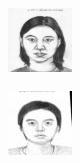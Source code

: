\documentclass{IEEEcsmag}
\begin{document}
\begin{figure}[ht]
\begin{subfigure}{0.12\textwidth}
    \end{subfigure}
    \begin{subfigure}{0.12\textwidth}
        \includegraphics[width=\linewidth]{CUHK_Student/draws_resized/f1-008-01-sz1.jpg}
    \end{subfigure}
    \begin{subfigure}{0.12\textwidth}
        \includegraphics[width=\linewidth]{CUHK_Student/draws_resized/M2-018-01-sz1.jpg}
    \end{subfigure}


\end{figure}
\end{document}
